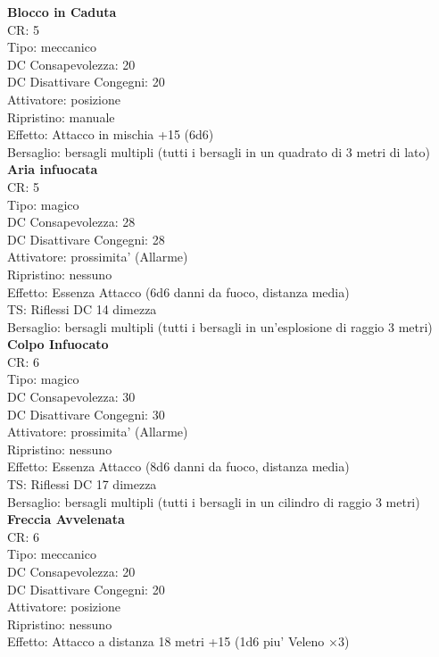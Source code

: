 \documentclass[a4paper,11pt,twoside,openany]{dndbook}
\begin{document}
{\begin{multicols}{2}
\textbf{Blocco in Caduta}\\
CR: 5 \\
Tipo: meccanico \\
DC Consapevolezza: 20 \\
DC Disattivare Congegni: 20 \\
Attivatore: posizione \\
Ripristino: manuale \\
Effetto: Attacco in mischia +15 (6d6) \\
Bersaglio: bersagli multipli (tutti i bersagli in un quadrato di 3 metri di lato)\\

\textbf{Aria infuocata}\\
CR: 5 \\
Tipo: magico \\
DC Consapevolezza: 28 \\
DC Disattivare Congegni: 28 \\
Attivatore: prossimita' (Allarme) \\
Ripristino: nessuno \\
Effetto: Essenza Attacco (6d6 danni da fuoco, distanza media)\\
TS: Riflessi DC 14 dimezza \\
Bersaglio: bersagli multipli (tutti i bersagli in un’esplosione di raggio 3 metri)\\

\textbf{Colpo Infuocato}\\
CR: 6 \\
Tipo: magico \\
DC Consapevolezza: 30 \\
DC Disattivare Congegni: 30 \\
Attivatore: prossimita' (Allarme) \\
Ripristino: nessuno \\
Effetto: Essenza Attacco (8d6 danni da fuoco, distanza media)\\
TS: Riflessi DC 17 dimezza \\
Bersaglio: bersagli multipli (tutti i bersagli in un cilindro di raggio 3 metri)\\

\textbf{Freccia Avvelenata}\\
CR: 6 \\
Tipo: meccanico \\
DC Consapevolezza: 20 \\
DC Disattivare Congegni: 20 \\
Attivatore: posizione \\
Ripristino: nessuno \\
Effetto: Attacco a distanza 18 metri +15 (1d6 piu' Veleno ×3)\\


\end{multicols}}
\end{document}
